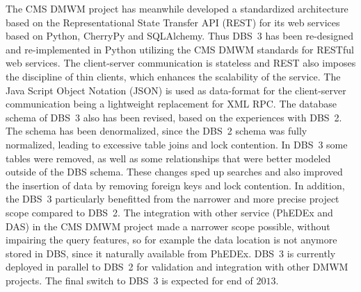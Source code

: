 The CMS DMWM project has meanwhile developed a standardized architecture based on the Representational State Transfer API (REST) \cite{REST} for its web services based on Python, CherryPy and SQLAlchemy. Thus DBS~3 has been re-designed and re-implemented in Python utilizing the CMS DMWM standards for RESTful web services. The client-server communication is stateless and REST also imposes the discipline of thin clients, which enhances the scalability of the service. The Java Script Object Notation (JSON) is used as data-format for the client-server communication being a lightweight replacement for XML RPC. The database schema of DBS~3 also has been revised, based on the experiences with DBS~2. The schema has been denormalized, since the DBS~2 schema was fully normalized, leading to excessive table joins and lock contention. In DBS~3 some tables were removed, as well as some relationships that were better modeled outside of the DBS schema. These changes sped up searches and also improved the insertion of data by removing foreign keys and lock contention. In addition, the DBS~3 particularly benefitted from the narrower and more precise project scope compared to DBS~2. The integration with other service (PhEDEx and DAS) in the CMS DMWM project made a narrower scope possible, without impairing the query features, so for example the data location is not anymore stored in DBS, since it naturally available from PhEDEx. DBS~3 is currently deployed in parallel to DBS~2 for validation and integration with other DMWM projects. The final switch to DBS~3 is expected for end of $2013$.

